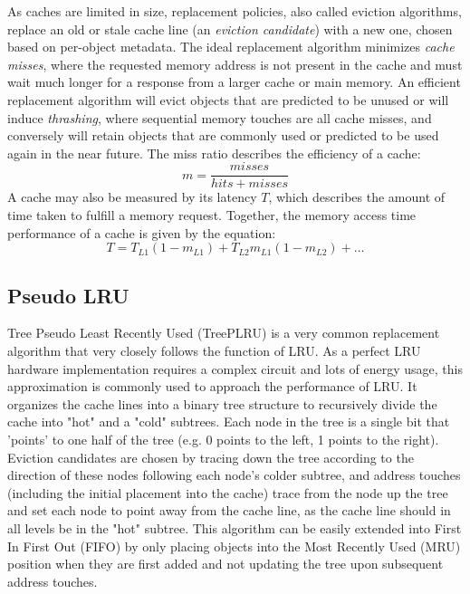 \documentclass[sigconf, screen, review]{acmart}
\begin{document}
As caches are limited in size, replacement policies, also called eviction algorithms,
replace an old or stale cache line (an \textit{eviction candidate}) with a new one,
chosen based on per-object metadata.
The ideal replacement algorithm minimizes \textit{cache misses}, where the requested memory address
is not present in the cache and must wait much longer for a response
from a larger cache or main memory.
An efficient replacement algorithm will evict objects that are predicted to be unused
or will induce \textit{thrashing}, where sequential memory touches are all cache misses,
and conversely will retain objects that are commonly used
or predicted to be used again in the near future.
The miss ratio describes the efficiency of a cache:
\begin{equation}
  m = \frac{misses}{hits + misses}
\end{equation}
A cache may also be measured by its latency $T$, which describes the amount of time taken
to fulfill a memory request.
Together, the memory access time performance of a cache is given by the equation:
\begin{equation}
  T = T_{L1}(1-m_{L1}) + T_{L2}m_{L1}(1-m_{L2}) + \dots
\end{equation}

\subsection{Pseudo LRU}

Tree Pseudo Least Recently Used (TreePLRU) is a very common replacement algorithm that
very closely follows the function of LRU.
As a perfect LRU hardware implementation requires a complex circuit and lots of energy usage,
this approximation is commonly used to approach the performance of LRU.
It organizes the cache lines into a binary tree structure to recursively divide the cache
into "hot" and a "cold" subtrees.
Each node in the tree is a single bit that 'points' to one half of the tree
(e.g. 0 points to the left, 1 points to the right).
Eviction candidates are chosen by tracing down the tree according to the direction of these nodes
following each node's colder subtree,
and address touches (including the initial placement into the cache)
trace from the node up the tree and set each node to point away from the cache line,
as the cache line should in all levels be in the "hot" subtree.
This algorithm can be easily extended into First In First Out (FIFO)
by only placing objects into the Most Recently Used (MRU) position when they are first added
and not updating the tree upon subsequent address touches.
\end{document}
